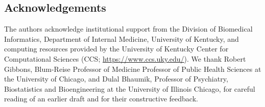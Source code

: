 \documentclass[pdflatex,sn-mathphys-num]{sn-jnl}%
\theoremstyle{thmstyleone}%
\theoremstyle{thmstyletwo}%
\theoremstyle{thmstylethree}%
\begin{document}
\subsection*{Acknowledgements}
The authors acknowledge institutional support from the Division of Biomedical Informatics, Department of Internal Medicine, University of Kentucky, and computing resources provided by the University of Kentucky Center for Computational Sciences (CCS; \url{https://www.ccs.uky.edu/}). We thank Robert  Gibbons, Blum-Reise Professor of Medicine
Professor of Public Health Sciences at the University of Chicago, and Dulal Bhaumik,  Professor of Psychiatry, Biostatistics and Bioengineering at the University of Illinois Chicago, for careful reading of an earlier draft and for their constructive feedback.



\end{document}
